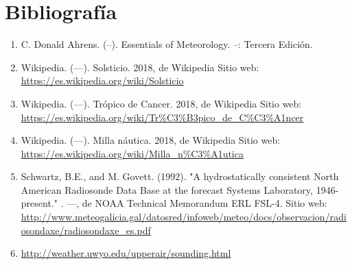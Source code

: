 \documentclass[12pt]{article}
\begin{document}
\pagebreak
\section{Bibliograf\'ia}
\noindent

\begin{enumerate} [\hspace{16pt} 1.]
		\item C. Donald Ahrens. (--). Essentials of Meteorology. --: Tercera Edici\'on.

		\item Wikipedia. (---). Solsticio. 2018, de Wikipedia Sitio web: \url{https://es.wikipedia.org/wiki/Solsticio}
        \item Wikipedia. (---). Tr\'opico de Cancer. 2018, de Wikipedia Sitio web: \url{https://es.wikipedia.org/wiki/Tr%C3%B3pico_de_C%C3%A1ncer}
        
        \item Wikipedia. (---). Milla n\'autica. 2018, de Wikipedia Sitio web: \url{https://es.wikipedia.org/wiki/Milla_n%C3%A1utica}
        
        \item Schwartz, B.E., and M. Govett. (1992). "A hydrostatically consistent North American Radiosonde Data Base at the forecast Systems Laboratory, 1946-present." . ---, de NOAA Technical Memorandum ERL FSL-4. Sitio web: \url{http://www.meteogalicia.gal/datosred/infoweb/meteo/docs/observacion/radiosondaxe/radiosondaxe_es.pdf}
        \item \url{http://weather.uwyo.edu/upperair/sounding.html}
\end{enumerate}

\end{document}
